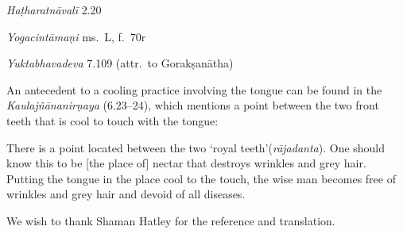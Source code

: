 \begin{ekdosis}
\begin{testimonia}[hp02_059]
\emph{Haṭharatnāvalī} 2.20

\begin{versinnote}
\tl{\var{°tṛṣāḥ ] °tṛṣā J,n1; °tṛṣaḥ T,t1}\\!}%
\end{versinnote}

\emph{Yogacintāmaṇi} ms.~L, f.~70r

\begin{versinnote}
\end{versinnote}

\emph{Yuktabhavadeva} 7.109 (attr.~to Gorakṣanātha)
\begin{versinnote}
\end{versinnote}

\end{testimonia}

\begin{philcomm}[hp02_059]
An antecedent to a cooling practice involving the tongue can be found in the \emph{Kaulajñānanirṇaya} (6.23–24), which mentions a point between the two front teeth that is cool to touch with the tongue:

\begin{versinnote}
There is a point located between the two ‘royal teeth’(\emph{rājadanta}). One should know this to be [the place of] nectar that destroys wrinkles and grey hair. Putting the tongue in the place cool to the touch, the wise man becomes free of wrinkles and grey hair and devoid of all diseases.
\end{versinnote}
We wish to thank Shaman Hatley for the reference and translation.
\end{philcomm}


\end{ekdosis}
